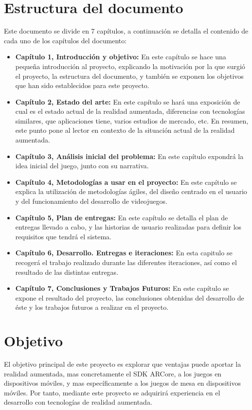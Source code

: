 \section{Estructura del documento}
Este documento se divide en 7 capítulos, a continuación se detalla el contenido de cada uno de los capítulos del documento:
\begin{itemize}
  \item \textbf{Capítulo 1, Introducción y objetivo:} En este capítulo se hace una pequeña introducción al proyecto, explicando la motivación por la que surgió el proyecto, la estructura del documento, y también se exponen los objetivos que han sido establecidos para este proyecto.
  \item \textbf{Capítulo 2, Estado del arte:} En este capítulo se hará una exposición de cual es el estado actual de la realidad aumentada, diferencias con tecnologías similares, que aplicaciones tiene, varios estudios de mercado, etc. En resumen, este punto pone al lector en contexto de la situación actual de la realidad aumentada.
  \item \textbf{Capítulo 3, Análisis inicial del problema:} En este capítulo expondrá la idea inicial del juego, junto con su narrativa.
  \item \textbf{Capítulo 4, Metodologías a usar en el proyecto:} En este capítulo se explica la utilización de metodologías ágiles, del diseño centrado en el usuario y del funcionamiento del desarrollo de videojuegos.
  \item \textbf{Capítulo 5, Plan de entregas:} En este capítulo se detalla el plan de entregas llevado a cabo, y las historias de usuario realizadas para definir los requisitos que tendrá el sistema.
  \item \textbf{Capítulo 6, Desarrollo. Entregas e iteraciones:} En esta capitulo se recogerá el trabajo realizado durante las diferentes iteraciones, así como el resultado de las distintas entregas.
  \item \textbf{Capítulo 7, Conclusiones y Trabajos Futuros:} En este capítulo se expone el resultado del proyecto, las conclusiones obtenidas del desarrollo de éste y los trabajos futuros a realizar en el proyecto.
\end{itemize}

\section{Objetivo}
El objetivo principal de este proyecto es explorar que ventajas puede aportar la realidad aumentada, mas concretamente el SDK ARCore, a los juegos en dispositivos móviles, y mas específicamente a los juegos de mesa en dispositivos móviles. Por tanto, mediante este proyecto se adquirirá experiencia en el desarrollo con tecnologías de realidad aumentada.\\

